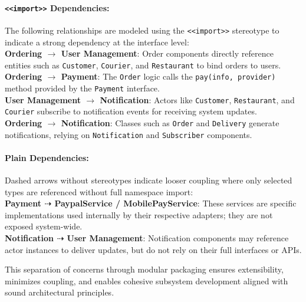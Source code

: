 \paragraph{\textbf{\texttt{<<import>>}} Dependencies:}The following relationships are modeled using the \texttt{<<import>>} stereotype to indicate a strong dependency at the interface level:\\
\textbf{Ordering $\rightarrow$ User Management}: Order components directly reference entities such as \texttt{Customer}, \texttt{Courier}, and \texttt{Restaurant} to bind orders to users.\\
\textbf{Ordering $\rightarrow$ Payment}: The \texttt{Order} logic calls the \texttt{pay(info, provider)} method provided by the \texttt{Payment} interface.\\
\textbf{User Management $\rightarrow$ Notification}: Actors like \texttt{Customer}, \texttt{Restaurant}, and \texttt{Courier} subscribe to notification events for receiving system updates.\\
\textbf{Ordering $\rightarrow$ Notification}: Classes such as \texttt{Order} and \texttt{Delivery} generate notifications, relying on \texttt{Notification} and \texttt{Subscriber} components.

\paragraph{Plain Dependencies:}Dashed arrows without stereotypes indicate looser coupling where only selected types are referenced without full namespace import:\\
\textbf{Payment $\dashrightarrow$ PaypalService / MobilePayService}: These services are specific implementations used internally by their respective adapters; they are not exposed system-wide.\\
\textbf{Notification $\dashrightarrow$ User Management}: Notification components may reference actor instances to deliver updates, but do not rely on their full interfaces or APIs.

This separation of concerns through modular packaging ensures extensibility, minimizes coupling, and enables cohesive subsystem development aligned with sound architectural principles.
